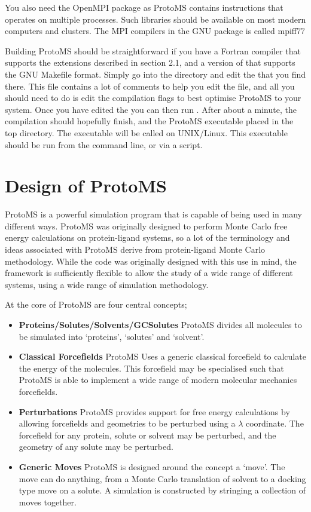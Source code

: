 \documentclass[letterpaper,10pt,english]{sphinxmanual}
\begin{document}
You also need the OpenMPI package as ProtoMS contains instructions that operates on multiple processes. Such libraries should be available on most modern computers and clusters. The MPI compilers in the GNU package is called mpiff77

Building ProtoMS should be straightforward if you have a Fortran compiler that supports the extensions described in section 2.1, and a version of  that supports the GNU Makefile format. Simply go into the  directory and edit the  that you find there. This file contains a lot of comments to help you edit the file, and all you should need to do is edit the compilation flags to best optimise ProtoMS to your system. Once you have edited the  you can then run . After about a minute, the compilation should hopefully finish, and the ProtoMS executable placed in the top directory. The executable will be called  on UNIX/Linux. This executable should be run from the command line, or via a script.


\chapter{Design of ProtoMS}
\label{protoms:design-of-protoms}\label{protoms::doc}
ProtoMS is a powerful simulation program that is capable of being used in many different ways. ProtoMS was originally designed to perform Monte Carlo free energy calculations on protein-ligand systems, so a lot of the terminology and ideas associated with ProtoMS derive from protein-ligand Monte Carlo methodology. While the code was originally designed with this use in mind, the framework is sufficiently flexible to allow the study of a wide range of different systems, using a wide range of simulation methodology.

At the core of ProtoMS are four central concepts;
\begin{itemize}
\item {} 
\textbf{Proteins/Solutes/Solvents/GCSolutes} ProtoMS divides all molecules to be simulated into ‘proteins’, ‘solutes’ and ‘solvent’.

\item {} 
\textbf{Classical Forcefields} ProtoMS Uses a generic classical forcefield to calculate the energy of the molecules. This forcefield may be specialised such that ProtoMS is able to implement a wide range of modern molecular mechanics forcefields.

\item {} 
\textbf{Perturbations} ProtoMS provides support for free energy calculations by allowing forcefields and geometries to be perturbed using a \(\lambda\) coordinate. The forcefield for any protein, solute or solvent may be perturbed, and the geometry of any solute may be perturbed.

\item {} 
\textbf{Generic Moves} ProtoMS is designed around the concept a ‘move’. The move can do anything, from a Monte Carlo translation of solvent to a docking type move on a solute. A simulation is constructed by stringing a collection of moves together.

\end{itemize}
\end{document}
